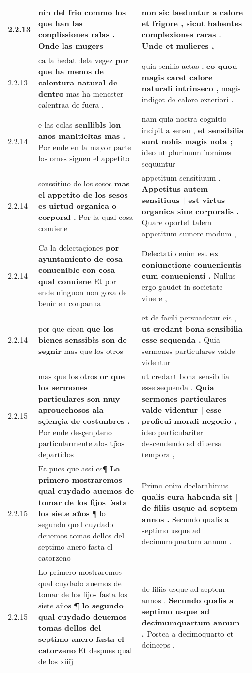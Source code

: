\begin{tabular}{|p{1cm}|p{6.5cm}|p{6.5cm}|}
2.2.13 & nin del frio \textbf{ commo los que han las conplissiones ralas . } Onde las mugers & non sic laeduntur a calore et frigore , \textbf{ sicut habentes complexiones raras . } Unde et mulieres , \\\hline
2.2.13 & ca la hedat dela vegez \textbf{ por que ha menos de calentura natural de dentro } mas ha menester calentraa de fuera . & quia senilis aetas , \textbf{ eo quod magis caret calore naturali intrinseco , } magis indiget de calore exteriori . \\\hline
2.2.14 & e las colas \textbf{ senllibls lon anos manitieltas mas . } Por ende en la mayor parte los omes siguen el appetito & nam quia nostra cognitio incipit a sensu , \textbf{ et sensibilia sunt nobis magis nota ; } ideo ut plurimum homines sequuntur \\\hline
2.2.14 & senssitiuo de los sesos \textbf{ mas el appetito de los sesos es uirtud organica o corporal . } Por la qual cosa conuiene & appetitum sensitiuum . \textbf{ Appetitus autem sensitiuus | est virtus organica siue corporalis . } Quare oportet talem appetitum sumere modum , \\\hline
2.2.14 & Ca la delectaçiones \textbf{ por ayuntamiento de cosa conuenible con cosa qual conuiene } Et por ende ninguon non goza de beuir en conpanna & Delectatio enim est \textbf{ ex coniunctione conuenientis cum conuenienti . } Nullus ergo gaudet in societate viuere , \\\hline
2.2.14 & por que ciean \textbf{ que los bienes senssibłs son de segnir } mas que los otros & et de facili persuadetur eis , \textbf{ ut credant bona sensibilia esse sequenda . } Quia sermones particulares valde videntur \\\hline
2.2.15 & mas que los otros \textbf{ or que los sermones particulares son muy aprouechosos ala sçiençia de costunbres . } Por ende desçenpteno particularmente alos tp̃os departidos & ut credant bona sensibilia esse sequenda . \textbf{ Quia sermones particulares valde videntur | esse proficui morali negocio , } ideo particulariter descendendo ad diuersa tempora , \\\hline
2.2.15 & Et pues que assi es¶ \textbf{ Lo primero mostraremos qual cuydado auemos de tomar de los fijos fasta los siete años } ¶ lo segundo qual cuydado deuemos tomas dellos del septimo anero fasta el catorzeno & Primo enim declarabimus \textbf{ qualis cura habenda sit | de filiis usque ad septem annos . } Secundo qualis a septimo usque ad decimumquartum annum . \\\hline
2.2.15 & Lo primero mostraremos qual cuydado auemos de tomar de los fijos fasta los siete años \textbf{ ¶ lo segundo qual cuydado deuemos tomas dellos del septimo anero fasta el catorzeno } Et despues qual de los xiiij̊ & de filiis usque ad septem annos . \textbf{ Secundo qualis a septimo usque ad decimumquartum annum . } Postea a decimoquarto et deinceps . \\\hline

\end{tabular}
